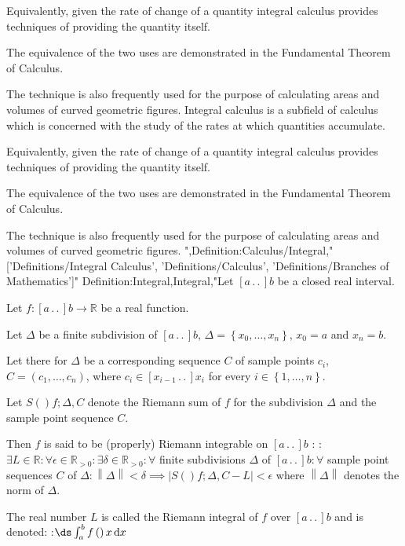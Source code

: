 Equivalently, given the rate of change of a quantity integral calculus provides techniques of providing the quantity itself.

The equivalence of the two uses are demonstrated in the Fundamental Theorem of Calculus.

The technique is also frequently used for the purpose of calculating areas and volumes of curved geometric figures.
Integral calculus is a subfield of calculus which is concerned with the study of the rates at which quantities accumulate.

Equivalently, given the rate of change of a quantity integral calculus provides techniques of providing the quantity itself.

The equivalence of the two uses are demonstrated in the Fundamental Theorem of Calculus.

The technique is also frequently used for the purpose of calculating areas and volumes of curved geometric figures.
",Definition:Calculus/Integral,"['Definitions/Integral Calculus', 'Definitions/Calculus', 'Definitions/Branches of Mathematics']"
Definition:Integral,Integral,"Let $\left[ a \,.\,.\,   \right]b$ be a closed real interval.

Let $f: \left[ a \,.\,.\,   \right]b \to \mathbb R$ be a real function.

Let $\Delta$ be a finite subdivision of $\left[ a \,.\,.\,   \right]b$, $\Delta = \left\lbrace x_0, \ldots, x_n \right\rbrace$, $x_0 = a$ and $x_n = b$.

Let there for $\Delta$ be a corresponding sequence $C$ of sample points $c_i$, $C = \left( c_1, \ldots, c_n \right)$, where $c_i \in \left[ x_{i - 1}  \,.\,.\,   \right]{x_i}$ for every $i \in \left\lbrace 1, \ldots, n \right\rbrace$.

Let $S \left(   \right){f; \Delta, C}$ denote the Riemann sum of $f$ for the subdivision $\Delta$ and the sample point sequence $C$.


Then $f$ is said to be (properly) Riemann integrable on $\left[ a \,.\,.\,   \right]b$ :
:$\exists L \in \mathbb R: \forall \epsilon \in \mathbb R_{>0}: \exists \delta \in \mathbb R_{>0}: \forall$ finite subdivisions $\Delta$ of $\left[ a \,.\,.\,   \right]b: \forall$ sample point sequences $C$ of $\Delta: \left\lVert \Delta \right\rVert < \delta \implies \left\lvert S \left(   \right){f; \Delta, C} - L \right\rvert < \epsilon$
where $\left\lVert \Delta \right\rVert$ denotes the norm of $\Delta$.


The real number $L$ is called the Riemann integral of $f$ over $\left[ a \,.\,.\,   \right]b$ and is denoted:
:$\ds \int_a^b f \left(   \right)x \,\mathrm d x$


